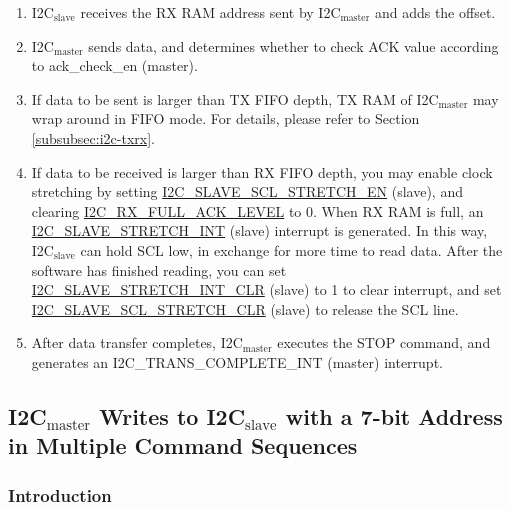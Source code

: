 \documentclass[main\_\_EN.tex]{subfiles}
\begin{document}
\begin{enumerate}
\begin{itemize}
\item Match: If the received ACK value matches ack\_exp (master) (the expected ACK value), I2C$_\text{master}$ continues data transfer.
\item Not match: If the received ACK value does not match ack\_exp, I2C$_\text{master}$ generates an I2C\_NACK\_INT (master) interrupt and stops data transfer.
\end{itemize}
\item I2C$_\text{slave}$ receives the RX RAM address sent by I2C$_\text{master}$ and adds the offset.
\item I2C$_\text{master}$ sends data, and determines whether to check ACK value according to ack\_check\_en (master).
\item If data to be sent is larger than TX FIFO depth, TX RAM of I2C$_\text{master}$ may wrap around in FIFO mode. For details, please refer to Section \ref{subsubsec:i2c-txrx}.
\item If data to be received is larger than RX FIFO depth, you may enable clock stretching by setting \hyperref[fielddesc:I2CSLAVESCLSTRETCHEN]{I2C\_SLAVE\_SCL\_STRETCH\_EN} (slave), and clearing \hyperref[fielddesc:I2CRXFULLACKLEVEL]{I2C\_RX\_FULL\_ACK\_LEVEL} to 0. When RX RAM is full, an \hyperref[int:i2c-slave-stretch]{I2C\_SLAVE\_STRETCH\_INT} (slave) interrupt is generated. In this way, I2C$_\text{slave}$ can hold SCL low, in exchange for more time to read data. After the software has finished reading, you can set \hyperref[fielddesc:I2CSLAVESTRETCHINTCLR]{I2C\_SLAVE\_STRETCH\_INT\_CLR} (slave) to 1 to clear interrupt, and set \hyperref[fielddesc:I2CSLAVESCLSTRETCHCLR]{I2C\_SLAVE\_SCL\_STRETCH\_CLR} (slave) to release the SCL line.
\item After data transfer completes, I2C$_\text{master}$ executes the STOP command, and generates an I2C\_TRANS\_COMPLETE\_INT (master) interrupt.
\end{enumerate}

\subsection{\texorpdfstring{I2C$_\text{master}$ Writes to I2C$_\text{slave}$ with a 7-bit Address in Multiple Command Sequences}{I2C master Writes to I2C slave with a 7-bit Address in Multiple Command Sequences}}

\subsubsection{Introduction}
\end{document}
